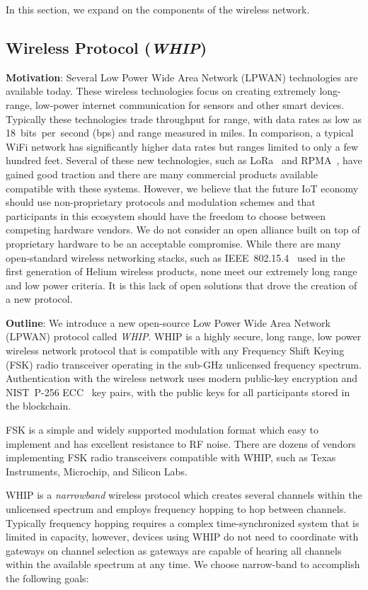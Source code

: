 \documentclass[letterpaper,11pt]{article}
\begin{document}
In this section, we expand on the components of the wireless network.

\subsection{Wireless Protocol (\emph{WHIP})}\label{whip}

\textbf{Motivation}: Several Low Power Wide Area Network (LPWAN) technologies are available today. These wireless technologies focus on creating extremely long-range, low-power internet communication for sensors and other smart devices. Typically these technologies trade throughput for range, with data rates as low as 18~bits~per~second (bps) and range measured in miles. In comparison, a typical WiFi network has significantly higher data rates but ranges limited to only a few hundred feet. Several of these new technologies, such as LoRa~\cite{lora} and RPMA~\cite{rpma}, have gained good traction and there are many commercial products available compatible with these systems. However, we believe that the future IoT economy should use non-proprietary protocols and modulation schemes and that participants in this ecosystem should have the freedom to choose between competing hardware vendors. We do not consider an open alliance built on top of proprietary hardware to be an acceptable compromise. While there are many open-standard wireless networking stacks, such as IEEE~802.15.4~\cite{ieee802_15_4} used in the first generation of Helium wireless products, none meet our extremely long range and low power criteria. It is this lack of open solutions that drove the creation of a new protocol.

\textbf{Outline}: We introduce a new open-source Low Power Wide Area Network (LPWAN) protocol called \emph{WHIP}. WHIP is a highly secure, long range, low power wireless network protocol that is compatible with any Frequency Shift Keying (FSK) radio transceiver operating in the sub-GHz unlicensed frequency spectrum. Authentication with the wireless network uses modern public-key encryption and NIST~P-256 ECC~\cite{ecc} key pairs, with the public keys for all participants stored in the blockchain.

FSK is a simple and widely supported modulation format which easy to implement and has excellent resistance to RF noise. There are dozens of vendors implementing FSK radio transceivers compatible with WHIP, such as Texas Instruments, Microchip, and Silicon Labs.

WHIP is a \emph{narrowband} wireless protocol which creates several channels within the unlicensed spectrum and employs frequency hopping to hop between channels. Typically frequency hopping requires a complex time-synchronized system that is limited in capacity, however, devices using WHIP do not need to coordinate with gateways on channel selection as gateways are capable of hearing all channels within the available spectrum at any time. We choose narrow-band to accomplish the following goals:
\end{document}
